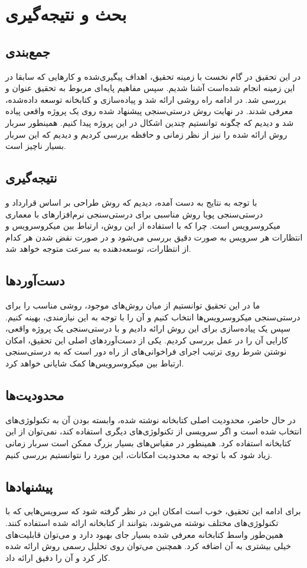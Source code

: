 \chapter{بحث و نتیجه‌گیری}
\section{جمع‌بندی}
در این تحقیق در گام نخست با زمینه تحقیق، اهداف پیگیری‌شده و کارهایی که سابقا در این زمینه انجام شده‌است آشنا شدیم. سپس مفاهیم پایه‌ای مربوط به تحقیق عنوان و بررسی شد. در ادامه راه روشی ارائه شد و پیاده‌سازی‌ و کتابخانه توسعه داده‌شده، معرفی شدند. در نهایت روش درستی‌سنجی پیشنهاد شده روی یک پروژه واقعی پیاده شد و دیدیم که چگونه توانستیم چندین اشکال در این پروژه پیدا کنیم. همینطور سربار روش ارائه شده را نیز از نظر زمانی و حافظه بررسی کردیم و دیدیم که این سربار بسیار ناچیز است.

\section{نتیجه‌گیری}
با توجه به نتایج به دست آمده، دیدیم که روش طراحی بر اساس قرارداد و درستی‌سنجی پویا روش مناسبی برای درستی‌سنجی نرم‌افزارهای با معماری میکروسرویس است. چرا که با استفاده از این روش، ارتباط بین میکروسرویس‌ و انتظارات هر سرویس به صورت دقیق بررسی می‌شود و در صورت نقض شدن هر کدام از انتظارات، توسعه‌دهنده به سرعت متوجه خواهد شد.

\section{دست‌آورد‌ها}
ما در این تحقیق توانستیم از میان روش‌های موجود، روشی مناسب را برای درستی‌سنجی میکروسرویس‌ها انتخاب کنیم و آن را با توجه به این نیازمندی، بهینه کنیم. سپس یک پیاده‌سازی برای این روش ارائه دادیم و با درستی‌سنجی یک پروژه واقعی، کارایی آن را در عمل بررسی کردیم. یکی از دست‌آوردهای اصلی این تحقیق، امکان نوشتن شرط روی ترتیب اجرای فراخوانی‌های از راه دور است که به درستی‌سنجی ارتباط بین میکروسرویس‌ها کمک شایانی خواهد کرد.

\section{محدودیت‌ها}
در حال حاضر، محدودیت اصلی کتابخانه نوشته شده، وابسته بودن آن به تکنولوژی‌های انتخاب شده است و اگر سرویسی از تکنولوژی‌های دیگری استفاده کند، نمی‌توان از این کتابخانه استفاده کرد. همینطور در مقیاس‌های بسیار بزرگ ممکن است سربار زمانی زیاد شود که با توجه به محدودیت امکانات، این مورد را نتوانستیم بررسی کنیم.

\section{پیشنهادها}
برای ادامه این تحقیق، خوب است امکان این در نظر گرفته شود که سرویس‌هایی که با تکنولوژی‌های مختلف نوشته می‌شوند، بتوانند از کتابخانه ارائه شده استفاده کنند. همین‌طور واسط کتابخانه معرفی شده بسیار جای بهبود دارد و می‌توان قابلیت‌های خیلی بیشتری به آن اضافه کرد. همچنین می‌توان روی تحلیل رسمی روش ارائه شده کار کرد و آن را دقیق ارائه داد.
